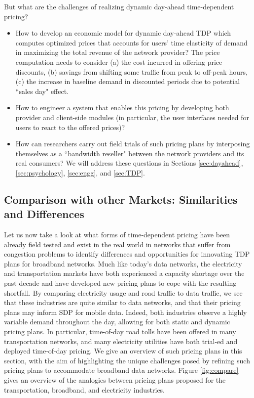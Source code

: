 But what are the challenges of realizing dynamic day-ahead time-dependent pricing?
\begin{itemize}
\item How to develop an economic model for dynamic day-ahead TDP which computes optimized prices that accounts for users' time elasticity of demand in maximizing the total revenue of the network provider? The price computation needs to consider (a) the cost incurred in offering price discounts, (b) savings from shifting some traffic from peak to off-peak hours, (c) the increase in baseline demand in discounted periods due to potential ``sales day" effect.
\item How to engineer a system that enables this pricing by developing both provider and client-side modules (in particular, the user interfaces needed for users to react to the offered prices)?
\item How can researchers carry out field trials of such pricing plans by interposing themselves as a ``bandwidth reseller" between the network providers and its real consumers?
We will address these questions in Sections \ref{sec:dayahead}, \ref{sec:psychology}, \ref{sec:engg}, and \ref{sec:TDP}.  
\end{itemize}

\subsection{Comparison with other Markets: Similarities and Differences }

Let us now take a look at what forms of time-dependent pricing have been already field tested and exist in the real world in networks that suffer from congestion problems to identify differences and opportunities for innovating TDP plans for broadband networks.   
Much like today's data networks, the electricity and transportation markets have both experienced a capacity shortage over the past decade and have developed new pricing plans to cope with the resulting shortfall. By comparing electricity usage and road traffic to data traffic, we see that these industries are quite similar to data networks, and that their pricing plans may inform SDP for mobile data. Indeed, both industries observe a highly variable demand throughout the day, allowing for both static and dynamic pricing plans.
In particular, time-of-day road tolls have been offered in many transportation networks, and many electricity utilities have both trial-ed and deployed time-of-day pricing. We give an overview of such pricing plans in this section, with the aim of highlighting the unique challenges posed by refining such pricing plans to accommodate broadband data networks. Figure \ref{fig:compare} gives an overview of the analogies between pricing plans proposed for the transportation, broadband, and electricity industries.

